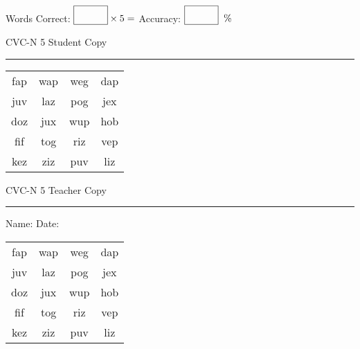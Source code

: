 \documentclass{memoir}
\begin{document}
\small

Words Correct: $\fbox{\phantom{\huge 100}} \times 5 = $ Accuracy: $\fbox{\phantom{\huge 100}}\;\; \%$ 

\vfill

\newpage


\footnotesize \noindent
CVC-N 5 \hfill Student Copy
\smallskip
\hrule

\Large

\setlength{\tabcolsep}{14pt}
\def\arraystretch{2}

{\selectfont


\begin{vplace}[0.5]
\begin{center}
\begin{tabular}{cccc}
fap & wap & weg & dap \\
juv & laz & pog & jex \\
doz & jux & wup & hob \\
fif & tog & riz & vep \\
kez & ziz & puv & liz \\
\end{tabular}
\end{center}
\end{vplace}

}

\newpage

\footnotesize \noindent
CVC-N 5 \hfill Teacher Copy
\smallskip
\hrule

\small

\vfill

\noindent
Name: \underline{\hspace{1.75in}} \hfill Date: \underline{\hspace{1in}}

\Large

{\selectfont


\begin{vplace}[0.5]
\begin{center}
\begin{tabular}{cccc}
fap & wap & weg & dap \\
juv & laz & pog & jex \\
doz & jux & wup & hob \\
fif & tog & riz & vep \\
kez & ziz & puv & liz \\
\end{tabular}
\end{center}
\end{vplace}



}
\end{document}
